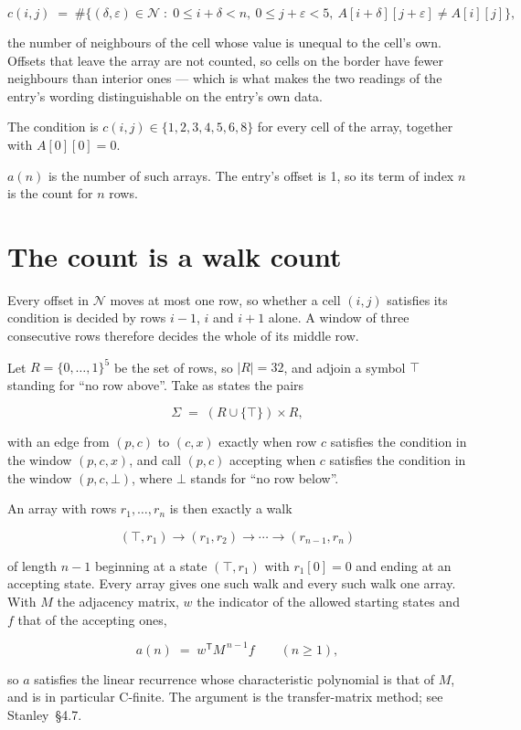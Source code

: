 \documentclass[11pt]{article}
\theoremstyle{definition}
\begin{document}
\[c(i,j) \;=\; \#\bigl\{(\delta,\varepsilon)\in\mathcal{N} \;:\; 0\le i+\delta<n,\ 0\le j+\varepsilon<5,\ A[i+\delta][j+\varepsilon] \neq A[i][j]\bigr\},\]

the number of neighbours of the cell whose value is unequal to the cell's own. Offsets that leave the array are not counted, so cells on the border have fewer neighbours than interior ones --- which is what makes the two readings of the entry's wording distinguishable on the entry's own data.

The condition is $c(i,j) \in \{1, 2, 3, 4, 5, 6, 8\}$ for every cell of the array, together with $A[0][0]=0$.

$a(n)$ is the number of such arrays. The entry's offset is 1, so its term of index $n$ is the count for $n$ rows.

\section{The count is a walk count}

Every offset in $\mathcal{N}$ moves at most one row, so whether a cell $(i,j)$ satisfies its condition is decided by rows $i-1$, $i$ and $i+1$ alone. A window of three consecutive rows therefore decides the whole of its middle row.

Let $R = \{0,\dots,1\}^{5}$ be the set of rows, so $|R| = 32$, and adjoin a symbol $\top$ standing for ``no row above''. Take as states the pairs

\[\Sigma \;=\; (R \cup \{\top\}) \times R,\]

with an edge from $(p,c)$ to $(c,x)$ exactly when row $c$ satisfies the condition in the window $(p,c,x)$, and call $(p,c)$ accepting when $c$ satisfies the condition in the window $(p,c,\bot)$, where $\bot$ stands for ``no row below''.

An array with rows $r_1,\dots,r_n$ is then exactly a walk

\[(\top,r_1) \to (r_1,r_2) \to \cdots \to (r_{n-1},r_n)\]

of length $n-1$ beginning at a state $(\top,r_1)$ with $r_1[0]=0$ and ending at an accepting state. Every array gives one such walk and every such walk one array. With $M$ the adjacency matrix, $w$ the indicator of the allowed starting states and $f$ that of the accepting ones,

\[a(n) \;=\; w^{\mathsf T} M^{\,n-1} f \qquad (n \ge 1),\]

so $a$ satisfies the linear recurrence whose characteristic polynomial is that of $M$, and is in particular C-finite. The argument is the transfer-matrix method; see Stanley~\S4.7.
\end{document}
